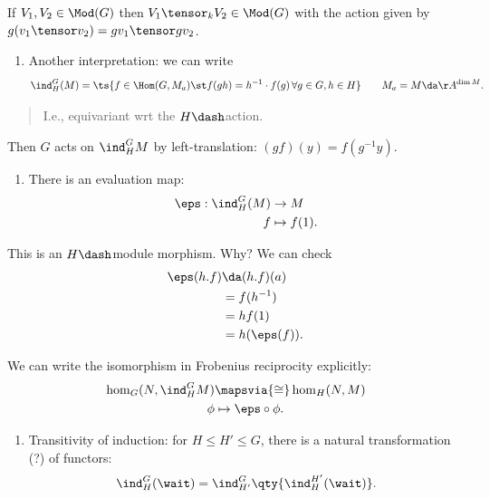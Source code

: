 If \(V_1, V_2 \in \Mod(G)\) then \(V_1 \tensor_k V_2 \in \Mod(G)\) with
the action given by \(g(v_1\tensor v_2) = gv_1 \tensor gv_2\).

\begin{enumerate}
\def\labelenumi{\arabic{enumi}.}
\setcounter{enumi}{5}
\tightlist
\item
  Another interpretation: we can write
  \begin{align*}  
  \ind_H^G(M) = \ts{f\in \Hom(G, M_a)
  \st
  f(gh) = h^{-1} \cdot f(g)
  \, \forall g\in G, h\in H} \qquad M_a = M \da \AA^{\dim M}
  .\end{align*}
\end{enumerate}

\begin{quote}
I.e., equivariant wrt the \(H\dash\)action.
\end{quote}

Then \(G\) acts on \(\ind_H^G M\) by left-translation:
\((gf)(y) = f(g^{-1} y)\).

\begin{enumerate}
\def\labelenumi{\arabic{enumi}.}
\setcounter{enumi}{6}
\tightlist
\item
  There is an evaluation map:
  \begin{align*}  
  \eps: \ind_H^G(M) &\to M \\ 
  f&\mapsto f(1)
  .\end{align*}
\end{enumerate}

This is an \(H\dash\)module morphism. Why? We can check
\begin{align*}  
\eps(h.f) 
&\da (h.f)(a) \\
&= f(h^{-1} ) \\
&= hf(1) \\
&= h(\eps(f))
.\end{align*}

We can write the isomorphism in Frobenius reciprocity explicitly:
\begin{align*}  
\hom_G(N, \ind_H^G M) &\mapsvia{\cong} \hom_H(N, M) \\
\phi & \mapsto \eps \circ \phi
.\end{align*}

\begin{enumerate}
\def\labelenumi{\arabic{enumi}.}
\setcounter{enumi}{7}
\tightlist
\item
  Transitivity of induction: for \(H\leq H' \leq G\), there is a natural
  transformation (?) of functors:
  \begin{align*}  
  \ind_H^G(\wait) = \ind_{H'}^G\qty{\ind_H^{H'}(\wait) }
  .\end{align*}
\end{enumerate}

